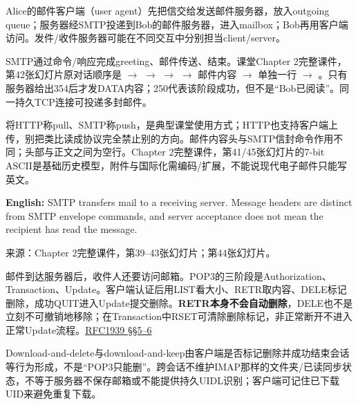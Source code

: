 

Alice的邮件客户端（user agent）先把信交给发送邮件服务器，放入outgoing queue；服务器经SMTP投递到Bob的邮件服务器，进入mailbox；Bob再用客户端访问。发件/收件服务器可能在不同交互中分别担当client/server。


SMTP通过命令/响应完成greeting、邮件传送、结束。课堂Chapter 2完整课件，第42张幻灯片原对话顺序是  \ensuremath{\to}  \ensuremath{\to}  \ensuremath{\to}  \ensuremath{\to} 邮件内容 \ensuremath{\to} 单独一行 \ensuremath{\to} 。只有服务器给出354后才发DATA内容；250代表该阶段成功，但不是“Bob已阅读”。同一持久TCP连接可投递多封邮件。




将HTTP称pull、SMTP称push，是典型课堂使用方式；HTTP也支持客户端上传，别把类比读成协议完全禁止别的方向。邮件内容头与SMTP信封命令作用不同；头部与正文之间为空行。Chapter 2完整课件，第41/45张幻灯片的7-bit ASCII是基础历史模型，附件与国际化需编码/扩展，不能说现代电子邮件只能写英文。


\textbf{English:} SMTP transfers mail to a receiving server. Message headers are distinct from SMTP envelope commands, and server acceptance does not mean the recipient has read the message.


来源：Chapter 2完整课件，第39–43张幻灯片；第44张幻灯片。








邮件到达服务器后，收件人还要访问邮箱。POP3的三阶段是Authorization、Transaction、Update。客户端认证后用LIST看大小、RETR取内容、DELE标记删除，成功QUIT进入Update提交删除。\textbf{RETR本身不会自动删除}，DELE也不是立刻不可撤销地移除；在Transaction中RSET可清除删除标记，非正常断开不进入正常Update流程。\href{https://www.rfc-editor.org/rfc/rfc1939}{RFC1939 §§5–6}


Download-and-delete与download-and-keep由客户端是否标记删除并成功结束会话等行为形成，不是“POP3只能删”。跨会话不维护IMAP那样的文件夹/已读同步状态，不等于服务器不保存邮箱或不能提供持久UIDL识别；客户端可记住已下载UID来避免重复下载。


